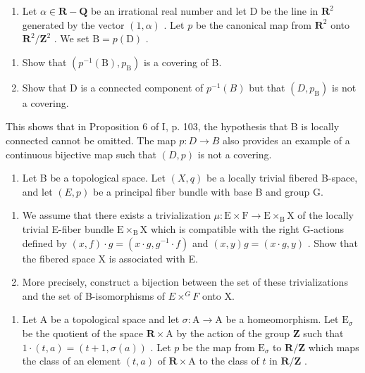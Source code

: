 \exercisegroup

\begin{enumerate}
\def\labelenumi{\arabic{enumi})}
\tightlist
\item
  Let \(\alpha \in \mathbf{R} - \mathbf{Q}\) be an irrational real number and let D be the line in \(\mathbf{R}^2\) generated by the vector \((1, \alpha)\) . Let \(p\) be the canonical map from \(\mathbf{R}^2\) onto \(\mathbf{R}^2 / \mathbf{Z}^2\) . We set \(\mathrm{B} = p(\mathrm{D})\) .
\end{enumerate}

\begin{enumerate}
\def\labelenumi{\alph{enumi})}
\item
  Show that \((p^{-1}(\mathrm{B}), p_{\mathrm{B}})\) is a covering of B.
\item
  Show that D is a connected component of \(p^{-1}(B)\) but that \((D, p_{\mathrm{B}})\) is not a covering.
\end{enumerate}

This shows that in Proposition 6 of I, p. 103, the hypothesis that B is locally connected cannot be omitted. The map \(p\colon D \to B\) also provides an example of a continuous bijective map such that \((D,p)\) is not a covering.

\begin{enumerate}
\def\labelenumi{\arabic{enumi})}
\setcounter{enumi}{1}
\tightlist
\item
  Let B be a topological space. Let \((X,q)\) be a locally trivial fibered B-space, and let \((E,p)\) be a principal fiber bundle with base B and group G.
\end{enumerate}

\begin{enumerate}
\def\labelenumi{\alph{enumi})}
\item
  We assume that there exists a trivialization \(\mu\colon\mathrm{E}\times\mathrm{F}\to\mathrm{E}\times_{\mathrm{B}}\mathrm{X}\) of the locally trivial E-fiber bundle \(\mathrm{E}\times_{\mathrm{B}}\mathrm{X}\) which is compatible with the right G-actions defined by \((x,f)\cdot g=(x\cdot g,g^{-1}\cdot f)\) and \((x,y)g=(x\cdot g,y)\) . Show that the fibered space X is associated with E.
\item
  More precisely, construct a bijection between the set of these trivializations and the set of B-isomorphisms of \(E \times^{G} F\) onto X.
\end{enumerate}

\begin{enumerate}
\def\labelenumi{\arabic{enumi})}
\setcounter{enumi}{2}
\tightlist
\item
  Let A be a topological space and let \(\sigma: \mathrm{A} \to \mathrm{A}\) be a homeomorphism. Let \(\mathrm{E}_{\sigma}\) be the quotient of the space \(\mathbf{R} \times \mathrm{A}\) by the action of the group \(\mathbf{Z}\) such that \(1 \cdot (t, a) = (t + 1, \sigma(a))\) . Let \(p\) be the map from \(\mathrm{E}_{\sigma}\) to \(\mathbf{R}/\mathbf{Z}\) which maps the class of an element \((t, a)\) of \(\mathbf{R} \times \mathrm{A}\) to the class of \(t\) in \(\mathbf{R}/\mathbf{Z}\) .
\end{enumerate}

